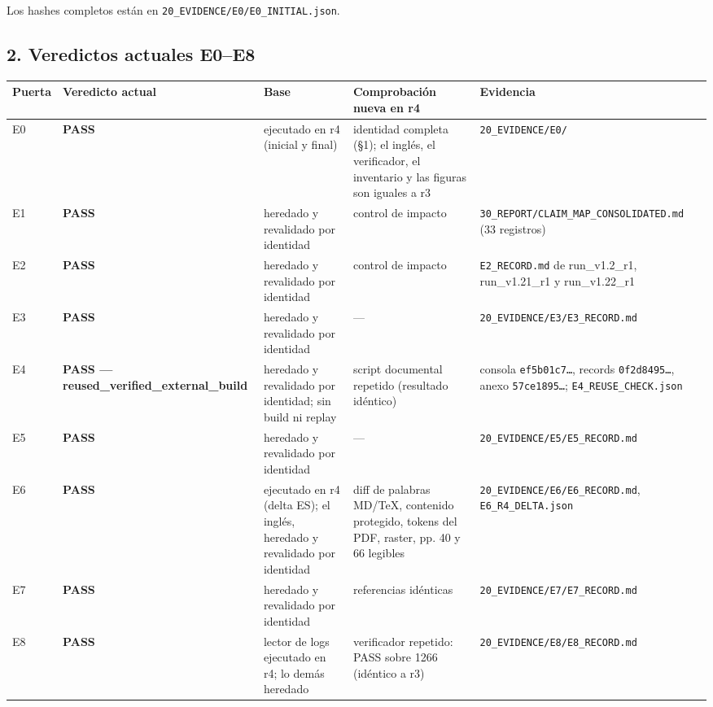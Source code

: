 \documentclass[
]{article}
\newcounter{none} %
\begin{document}
Los hashes completos están en \texttt{20\_EVIDENCE/E0/E0\_INITIAL.json}.

\subsection{2. Veredictos actuales
E0--E8}\label{2-veredictos-actuales-e0e8}

{\def\LTcaptype{none} %
\begin{longtable}[]{@{}lllll@{}}
\toprule\noalign{}
Puerta & Veredicto actual & Base & Comprobación nueva en r4 &
Evidencia \\
\midrule\noalign{}
\endhead
\bottomrule\noalign{}
\endlastfoot
E0 & \textbf{PASS} & ejecutado en r4 (inicial y final) & identidad
completa (§1); el inglés, el verificador, el inventario y las figuras
son iguales a r3 & \texttt{20\_EVIDENCE/E0/} \\
E1 & \textbf{PASS} & heredado y revalidado por identidad & control de
impacto & \texttt{30\_REPORT/CLAIM\_MAP\_CONSOLIDATED.md} (33
registros) \\
E2 & \textbf{PASS} & heredado y revalidado por identidad & control de
impacto & \texttt{E2\_RECORD.md} de run\_v1.2\_r1, run\_v1.21\_r1 y
run\_v1.22\_r1 \\
E3 & \textbf{PASS} & heredado y revalidado por identidad & --- &
\texttt{20\_EVIDENCE/E3/E3\_RECORD.md} \\
E4 & \textbf{PASS --- reused\_verified\_external\_build} & heredado y
revalidado por identidad; sin build ni replay & script documental
repetido (resultado idéntico) & consola \texttt{ef5b01c7…}, records
\texttt{0f2d8495…}, anexo \texttt{57ce1895…};
\texttt{E4\_REUSE\_CHECK.json} \\
E5 & \textbf{PASS} & heredado y revalidado por identidad & --- &
\texttt{20\_EVIDENCE/E5/E5\_RECORD.md} \\
E6 & \textbf{PASS} & ejecutado en r4 (delta ES); el inglés, heredado y
revalidado por identidad & diff de palabras MD/TeX, contenido protegido,
tokens del PDF, raster, pp. 40 y 66 legibles &
\texttt{20\_EVIDENCE/E6/E6\_RECORD.md}, \texttt{E6\_R4\_DELTA.json} \\
E7 & \textbf{PASS} & heredado y revalidado por identidad & referencias
idénticas & \texttt{20\_EVIDENCE/E7/E7\_RECORD.md} \\
E8 & \textbf{PASS} & lector de logs ejecutado en r4; lo demás heredado &
verificador repetido: PASS sobre 1266 (idéntico a r3) &
\texttt{20\_EVIDENCE/E8/E8\_RECORD.md} \\
\end{longtable}
}
\end{document}
